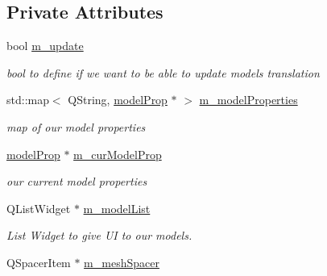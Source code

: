 \subsection*{Private Attributes}
\begin{DoxyCompactItemize}
\item 
\hypertarget{class_mesh_widget_aa919bf9e1a8f87a2f88beb5bebcc8365}{bool \hyperlink{class_mesh_widget_aa919bf9e1a8f87a2f88beb5bebcc8365}{m\-\_\-update}}\label{class_mesh_widget_aa919bf9e1a8f87a2f88beb5bebcc8365}

\begin{DoxyCompactList}\small\item\em bool to define if we want to be able to update models translation \end{DoxyCompactList}\item 
\hypertarget{class_mesh_widget_a5db4abbd4581a08f7e0cab81a36672a9}{std\-::map$<$ Q\-String, \hyperlink{struct_mesh_widget_1_1model_prop}{model\-Prop} $\ast$ $>$ \hyperlink{class_mesh_widget_a5db4abbd4581a08f7e0cab81a36672a9}{m\-\_\-model\-Properties}}\label{class_mesh_widget_a5db4abbd4581a08f7e0cab81a36672a9}

\begin{DoxyCompactList}\small\item\em map of our model properties \end{DoxyCompactList}\item 
\hypertarget{class_mesh_widget_aa9bc3fcd1cabd6c762c1592bba3ecb3d}{\hyperlink{struct_mesh_widget_1_1model_prop}{model\-Prop} $\ast$ \hyperlink{class_mesh_widget_aa9bc3fcd1cabd6c762c1592bba3ecb3d}{m\-\_\-cur\-Model\-Prop}}\label{class_mesh_widget_aa9bc3fcd1cabd6c762c1592bba3ecb3d}

\begin{DoxyCompactList}\small\item\em our current model properties \end{DoxyCompactList}\item 
\hypertarget{class_mesh_widget_aeb16152b584efae49428f395ae71d255}{Q\-List\-Widget $\ast$ \hyperlink{class_mesh_widget_aeb16152b584efae49428f395ae71d255}{m\-\_\-model\-List}}\label{class_mesh_widget_aeb16152b584efae49428f395ae71d255}

\begin{DoxyCompactList}\small\item\em List Widget to give U\-I to our models. \end{DoxyCompactList}\item 
\hypertarget{class_mesh_widget_a2a90703bcfd2bfba0f177763b9492bde}{Q\-Spacer\-Item $\ast$ \hyperlink{class_mesh_widget_a2a90703bcfd2bfba0f177763b9492bde}{m\-\_\-mesh\-Spacer}}\label{class_mesh_widget_a2a90703bcfd2bfba0f177763b9492bde}


\end{DoxyCompactItemize}
